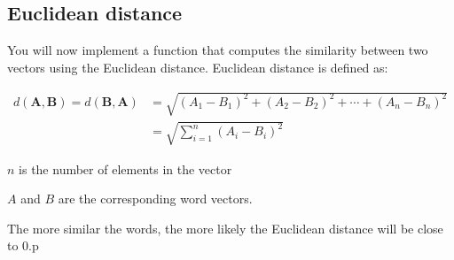 \documentclass[4apaper,12pt]{book}
\begin{document}
\subsection {Euclidean distance}
\begin{description}
  \item You will now implement a function that computes the similarity between two vectors using the Euclidean distance.
Euclidean distance is defined as:

\item $$ \begin{aligned} d(\mathbf{A}, \mathbf{B})=d(\mathbf{B}, \mathbf{A}) &=\sqrt{\left(A_{1}-B_{1}\right)^{2}+\left(A_{2}-B_{2}\right)^{2}+\cdots+\left(A_{n}-B_{n}\right)^{2}} \\ &=\sqrt{\sum_{i=1}^{n}\left(A_{i}-B_{i}\right)^{2}} \end{aligned}$$

\item $n$ is the number of elements in the vector
\item $A$ and $B$ are the corresponding word vectors.
\item The more similar the words, the more likely the Euclidean distance will be close to 0.p
\end{description}
\end{document}
